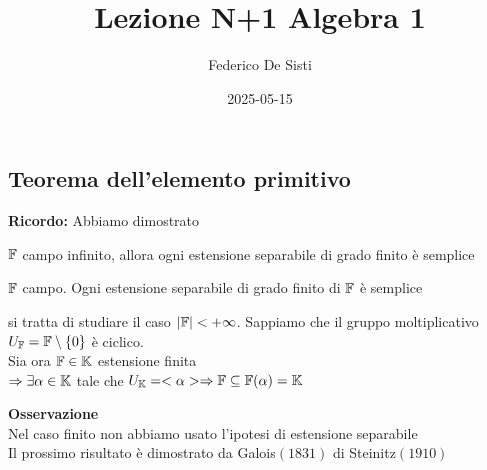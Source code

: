 \documentclass[12px]{article}
\title{Lezione N+1 Algebra 1}
\date{2025-05-15}
\author{Federico De Sisti}
\begin{document}
	\maketitle
	\newpage
	\subsection{Teorema dell'elemento primitivo}
	\textbf{Ricordo:} Abbiamo dimostrato
	\begin{teo}
		$\mathbb{F}$ campo infinito, allora ogni estensione separabile di grado finito è semplice
	\end{teo}
	\begin{teo}
		$\mathbb{F}$ campo. Ogni estensione separabile di grado finito di $\mathbb{F}$ è semplice
	\end{teo}
	\begin{dimo}
		si tratta di studiare il caso $|\mathbb{F}| < +\infty$. Sappiamo che il gruppo moltiplicativo $U_{\mathbb{F}} = \mathbb{F}\setminus\{0\}$  è ciclico. \\
		Sia ora $\mathbb{F} \in \mathbb{K}$ estensione finita\\
		 $ \Rightarrow \exists \alpha\in \mathbb{K}$  tale che $U_{\mathbb{K}} = <\alpha> \Rightarrow  \mathbb{F}\subseteq\mathbb{F}(\alpha) = \mathbb{K}$  
	\end{dimo}
	\textbf{Osservazione}\\
	Nel caso finito non abbiamo usato l'ipotesi di estensione separabile\\
	Il prossimo risultato è dimostrato da Galois$(1831)$ di  Steinitz$(1910)$ 
\end{document}
